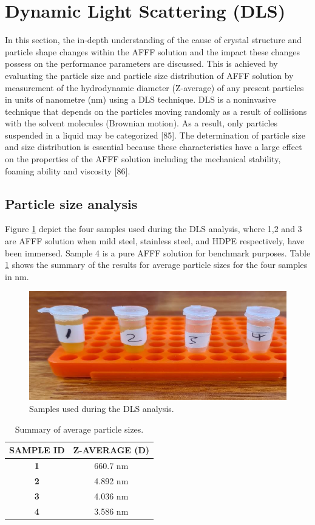 \documentclass[12pt]{report}
\begin{document}
\section{Dynamic Light Scattering (DLS)}
In this section, the in-depth understanding of the cause of crystal structure and particle shape changes within the AFFF solution and the impact these changes possess on the performance parameters are discussed. This is achieved by evaluating the particle size and particle size distribution of AFFF solution by measurement of the hydrodynamic diameter (Z-average) of any present particles in units of nanometre (nm) using a DLS technique. DLS is a noninvasive technique that depends on the particles moving randomly as a result of collisions with the solvent molecules (Brownian motion). As a result, only particles suspended in a liquid may be categorized [85]. The determination of particle size and size distribution is essential because these characteristics have a large effect on the properties of the AFFF solution including the mechanical stability, foaming ability and viscosity [86].

\subsection{Particle size analysis}
Figure \ref{ch5:figure:samples} depict the four samples used during the DLS analysis, where 1,2 and 3 are AFFF solution when mild steel, stainless steel, and HDPE respectively, have been immersed. Sample 4 is a pure AFFF solution for benchmark purposes. Table \ref{ch5:table:sizes} shows the summary of the results for average particle sizes for the four samples in nm.  
  
\begin{figure}[H]
    \includegraphics[width=.6\textwidth]{samples_used_during_the_dls_analysis.png}
    \caption{Samples used during the DLS analysis.}
    \label{ch5:figure:samples}
\end{figure}

\begin{table}[H]
\centering
\begin{tabular}{c c}
\hline
\textbf{SAMPLE ID} & \textbf{Z-AVERAGE (D)} \\
\hline
\textbf{1} & 660.7 nm \\
\textbf{2} & 4.892 nm \\
\textbf{3} & 4.036 nm \\
\textbf{4} & 3.586 nm \\
\hline
\end{tabular}

\caption{Summary of average particle sizes.}
\label{ch5:table:sizes}
\end{table}
\end{document}
